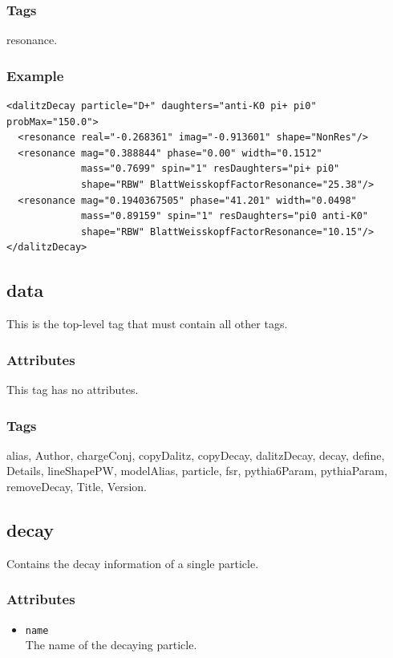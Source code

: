 \subsubsection*{Tags}
resonance.
\subsubsection*{Example}
{\footnotesize
\begin{verbatim}
<dalitzDecay particle="D+" daughters="anti-K0 pi+ pi0" probMax="150.0">
  <resonance real="-0.268361" imag="-0.913601" shape="NonRes"/>
  <resonance mag="0.388844" phase="0.00" width="0.1512"
             mass="0.7699" spin="1" resDaughters="pi+ pi0"
             shape="RBW" BlattWeisskopfFactorResonance="25.38"/>
  <resonance mag="0.1940367505" phase="41.201" width="0.0498"
             mass="0.89159" spin="1" resDaughters="pi0 anti-K0"
             shape="RBW" BlattWeisskopfFactorResonance="10.15"/>
</dalitzDecay>
\end{verbatim}
}

\subsection{data}
This is the top-level tag that must contain all other tags.
\subsubsection*{Attributes}
This tag has no attributes.
\subsubsection*{Tags}
alias, Author, chargeConj, copyDalitz, copyDecay, dalitzDecay, decay, define, Details, lineShapePW, modelAlias, particle, fsr, pythia6Param, pythiaParam, removeDecay, Title, Version.

\subsection{decay}
Contains the decay information of a single particle.
\subsubsection*{Attributes}
\begin{itemize}
\item{\tt name}\\
      The name of the decaying particle.
\end{itemize}
